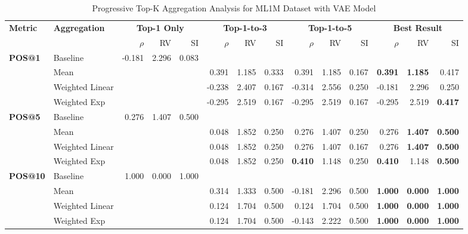 \documentclass{article}
\begin{document}
\begin{table}[htbp]
\centering
\caption{Progressive Top-K Aggregation Analysis for ML1M Dataset with VAE Model}
\label{tab:ml1m_vae_progressive_topk}
\footnotesize
\begin{tabular}{@{}llrrr|rrr|rrr|rrr@{}}
\toprule
\multirow{2}{*}{\textbf{Metric}} & \multirow{2}{*}{\textbf{Aggregation}} & \multicolumn{3}{c|}{\textbf{Top-1 Only}} & \multicolumn{3}{c|}{\textbf{Top-1-to-3}} & \multicolumn{3}{c|}{\textbf{Top-1-to-5}} & \multicolumn{3}{c}{\textbf{Best Result}} \\
\cmidrule(lr){3-5} \cmidrule(lr){6-8} \cmidrule(lr){9-11} \cmidrule(lr){12-14}
& & $\rho$ & RV & SI & $\rho$ & RV & SI & $\rho$ & RV & SI & $\rho$ & RV & SI \\
\midrule

\multirow{4}{*}{\textbf{POS@1}} 
& Baseline & -0.181 & 2.296 & 0.083 & & & & & & & & & \\
& Mean & & & & 0.391 & 1.185 & 0.333 & 0.391 & 1.185 & 0.167 & \textbf{0.391} & \textbf{1.185} & 0.417 \\
& Weighted Linear & & & & -0.238 & 2.407 & 0.167 & -0.314 & 2.556 & 0.250 & -0.181 & 2.296 & 0.250 \\
& Weighted Exp & & & & -0.295 & 2.519 & 0.167 & -0.295 & 2.519 & 0.167 & -0.295 & 2.519 & \textbf{0.417} \\
\midrule

\multirow{4}{*}{\textbf{POS@5}} 
& Baseline & 0.276 & 1.407 & 0.500 & & & & & & & & & \\
& Mean & & & & 0.048 & 1.852 & 0.250 & 0.276 & 1.407 & 0.250 & 0.276 & \textbf{1.407} & \textbf{0.500} \\
& Weighted Linear & & & & 0.048 & 1.852 & 0.250 & 0.276 & 1.407 & 0.167 & 0.276 & \textbf{1.407} & \textbf{0.500} \\
& Weighted Exp & & & & 0.048 & 1.852 & 0.250 & \textbf{0.410} & 1.148 & 0.250 & \textbf{0.410} & 1.148 & \textbf{0.500} \\
\midrule

\multirow{4}{*}{\textbf{POS@10}} 
& Baseline & 1.000 & 0.000 & 1.000 & & & & & & & & & \\
& Mean & & & & 0.314 & 1.333 & 0.500 & -0.181 & 2.296 & 0.500 & \textbf{1.000} & \textbf{0.000} & \textbf{1.000} \\
& Weighted Linear & & & & 0.124 & 1.704 & 0.500 & 0.124 & 1.704 & 0.500 & \textbf{1.000} & \textbf{0.000} & \textbf{1.000} \\
& Weighted Exp & & & & 0.124 & 1.704 & 0.500 & -0.143 & 2.222 & 0.500 & \textbf{1.000} & \textbf{0.000} & \textbf{1.000} \\
\midrule


\end{tabular}
\end{table}
\end{document}
